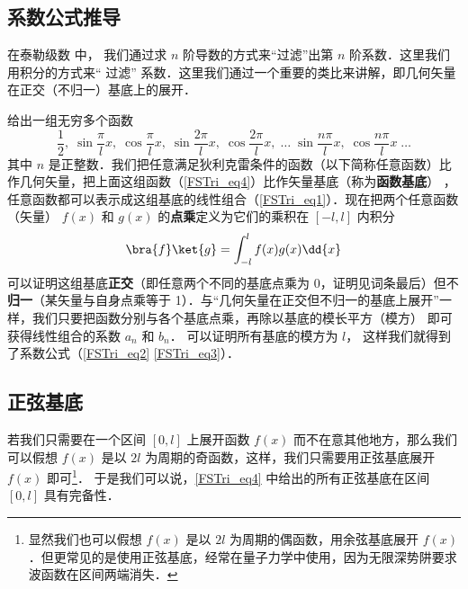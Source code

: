 \subsection{系数公式推导}

在泰勒级数 中，%
我们通过求 $n$ 阶导数的方式来“过滤”出第 $n$ 阶系数．这里我们用积分的方式来“ 过滤” 系数．这里我们通过一个重要的类比来讲解，即几何矢量在正交（不归一）基底上的展开．%

% 

给出一组无穷多个函数
\begin{equation}\label{FSTri_eq4}
\frac 12,\;   \sin\frac{\pi}{l} x,\;   \cos\frac{\pi}{l} x,\;   \sin\frac{2\pi}{l} x,\;   \cos\frac{2\pi}{l} x,\;   \dots\;\sin\frac{n\pi}{l} x,\;   \cos\frac{n\pi}{l} x\;   \dots
\end{equation}
其中 $n$ 是正整数．我们把任意满足狄利克雷条件的函数（以下简称任意函数）比作几何矢量，把上面这组函数（\autoref{FSTri_eq4}）比作矢量基底（称为\textbf{函数基底}）
，任意函数都可以表示成这组基底的线性组合（\autoref{FSTri_eq1}）．现在把两个任意函数（矢量） $f(x)$ 和 $g(x)$ 的\textbf{点乘}定义为它们的乘积在 $[-l,l]$ 内积分
\begin{equation}
\bra{f}\ket{g} = \int_{-l}^{l} f(x)g(x) \dd{x}
\end{equation}
可以证明这组基底\textbf{正交}（即任意两个不同的基底点乘为 0，证明见词条最后）但不\textbf{归一}（某矢量与自身点乘等于 1）．与“几何矢量在正交但不归一的基底上展开”一样，我们只要把函数分别与各个基底点乘，再除以基底的模长平方（模方）
即可获得线性组合的系数 $a_n$ 和 $b_n$． 可以证明所有基底的模方为 $l$， 这样我们就得到了系数公式（\autoref{FSTri_eq2} \autoref{FSTri_eq3}）．


\subsection{正弦基底}
若我们只需要在一个区间 $[0,l]$ 上展开函数 $f(x)$ 而不在意其他地方，那么我们可以假想 $f(x)$ 是以 $2l$ 为周期的奇函数，这样，我们只需要用正弦基底展开 $f(x)$ 即可\footnote{显然我们也可以假想 $f(x)$ 是以 $2l$ 为周期的偶函数，用余弦基底展开 $f(x)$．但更常见的是使用正弦基底，经常在量子力学中使用，因为无限深势阱要求波函数在区间两端消失．}． 于是我们可以说，\autoref{FSTri_eq4} 中给出的所有正弦基底在区间 $[0,l]$ 具有完备性．

